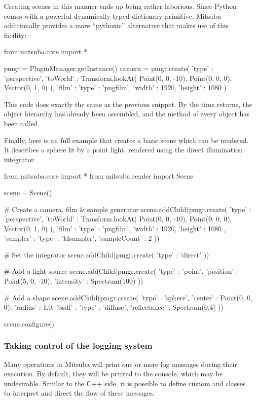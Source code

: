 Creating scenes in this manner ends up being rather laborious.
Since Python comes with a powerful dynamically-typed dictionary
primitive, Mitsuba additionally provides a more ``pythonic'' 
alternative that makes use of this facility:
\begin{python}
from mitsuba.core import *

pmgr = PluginManager.getInstance()
camera = pmgr.create({
	'type' : 'perspective',
	'toWorld' : Transform.lookAt(
		Point(0, 0, -10),
		Point(0, 0, 0),
		Vector(0, 1, 0)
	),
	'film' : {
		'type' : 'pngfilm',
		'width' : 1920,
		'height' : 1080
	}
})
\end{python}
This code does exactly the same as the previous snippet.
By the time  returns, the object
hierarchy has already been assembled, and the 
 method of every object
has been called.

Finally, here is an full example that creates a basic scene
which can be rendered. It describes a sphere lit by a point 
light, rendered using the direct illumination integrator.
\begin{python}
from mitsuba.core import *
from mitsuba.render import Scene

scene = Scene()

# Create a camera, film & sample generator
scene.addChild(pmgr.create({
	'type' : 'perspective',
	'toWorld' : Transform.lookAt(
		Point(0, 0, -10),
		Point(0, 0, 0),
		Vector(0, 1, 0)
	),
	'film' : {
		'type' : 'pngfilm',
		'width' : 1920,
		'height' : 1080
	},
	'sampler' : {
		'type' : 'ldsampler',
		'sampleCount' : 2
	}
}))

# Set the integrator
scene.addChild(pmgr.create({
	'type' : 'direct'
}))

# Add a light source
scene.addChild(pmgr.create({
	'type' : 'point',
	'position' : Point(5, 0, -10),
	'intensity' : Spectrum(100)
}))

# Add a shape
scene.addChild(pmgr.create({
	'type' : 'sphere',
	'center' : Point(0, 0, 0),
	'radius' : 1.0,
	'bsdf' : {
		'type' : 'diffuse',
		'reflectance' : Spectrum(0.4)
	}
}))

scene.configure()
\end{python}

\subsubsection{Taking control of the logging system}
Many operations in Mitsuba will print one or more log messages
during their execution. By default, they will be printed to the console,
which may be undesirable. Similar to the C++ side, it is possible to define
custom  and  classes to interpret and direct
the flow of these messages. 

